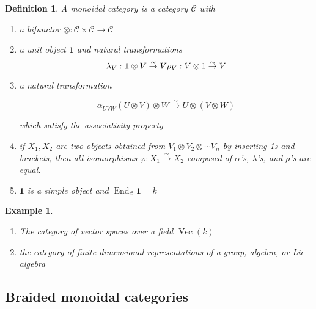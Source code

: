 \documentclass[]{article}
\newtheorem{defn}[theorem]{Definition}
\newtheorem{example}[theorem]{Example}
\newcommand{\isomto}{\overset{\sim}{\rightarrow}}
\newcommand{\End}{\operatorname{End}}
\numberwithin{equation}{subsection}
\begin{document}
\begin{defn}
    A \emph{monoidal category} is a category $\mathcal{C}$ with 
    \begin{enumerate}
    \renewcommand{\labelenumi}{\roman{enumi})}
        \item a bifunctor $\otimes: \mathcal{C} \times \mathcal{C} \to
            \mathcal{C}$
        \item a unit object $\mathbf{1}$ and natural transformations
            \begin{equation}
                \lambda_V : \mathbf{1} \otimes V \isomto V \\
                \rho_V : V \otimes 1 \isomto V
            \end{equation}
        \item a natural transformation 

            \begin{equation}
                \alpha_{UVW} (U \otimes V) \otimes W \isomto U \otimes (V \otimes W)
            \end{equation}

            which satisfy the associativity property 

        \item if $X_1, X_2$ are two objects obtained from $V_1 \otimes V_2 \otimes \cdots V_n$ by inserting 1s and brackets, then all isomorphisms $\varphi: X_1 \isomto X_2$ composed of $\alpha$'s, $\lambda$'s, and $\rho$'s are equal. 
        \item $\mathbf{1}$ is a simple object and $\End_\mathcal{C} \mathbf{1} = k$
    \end{enumerate}

\end{defn}

\begin{example}
    \begin{enumerate}
    \renewcommand{\labelenumi}{\roman{enumi})}
        \item The category of vector spaces over a field $\operatorname{Vec}(k)$
        \item the category of finite dimensional representations of a group, algebra, or Lie algebra
    \end{enumerate}
\end{example}
    
\subsection{Braided monoidal categories}
\end{document}
